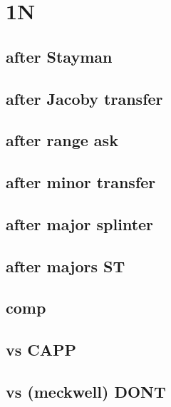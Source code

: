 \section{1N}


\subsection{after Stayman}


\subsection{after Jacoby transfer}


\subsection{after range ask}


\subsection{after minor transfer}


\subsection{after major splinter}


\subsection{after majors ST}


\subsection{comp}


\subsection{vs CAPP}


\subsection{vs (meckwell) DONT}



